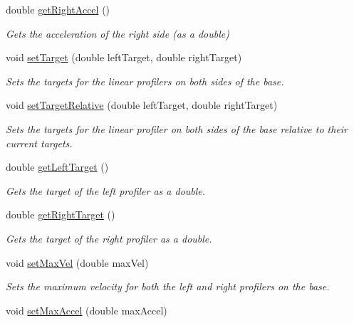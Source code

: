 \begin{DoxyCompactItemize}
double \mbox{\hyperlink{classfrc_1_1robot_1_1subsystems_1_1_base_a914de01840db6b8984e6594ff194ae00}{get\+Right\+Accel}} ()
\begin{DoxyCompactList}\small\item\em Gets the acceleration of the right side (as a double) \end{DoxyCompactList}\item 
void \mbox{\hyperlink{classfrc_1_1robot_1_1subsystems_1_1_base_a6d1643d8fb0b7cf4fff02f46c0edbd42}{set\+Target}} (double left\+Target, double right\+Target)
\begin{DoxyCompactList}\small\item\em Sets the targets for the linear profilers on both sides of the base. \end{DoxyCompactList}\item 
void \mbox{\hyperlink{classfrc_1_1robot_1_1subsystems_1_1_base_af59a0fae3d6c2c4150406fb02288d1a3}{set\+Target\+Relative}} (double left\+Target, double right\+Target)
\begin{DoxyCompactList}\small\item\em Sets the targets for the linear profiler on both sides of the base relative to their current targets. \end{DoxyCompactList}\item 
double \mbox{\hyperlink{classfrc_1_1robot_1_1subsystems_1_1_base_aa2dadd553dfc8910c56d24900a52f91e}{get\+Left\+Target}} ()
\begin{DoxyCompactList}\small\item\em Gets the target of the left profiler as a double. \end{DoxyCompactList}\item 
double \mbox{\hyperlink{classfrc_1_1robot_1_1subsystems_1_1_base_a4d560fe022c6baab267770a9e671ad7d}{get\+Right\+Target}} ()
\begin{DoxyCompactList}\small\item\em Gets the target of the right profiler as a double. \end{DoxyCompactList}\item 
void \mbox{\hyperlink{classfrc_1_1robot_1_1subsystems_1_1_base_ac9dd3bd7c9b68b3f2d2986e2f2dad632}{set\+Max\+Vel}} (double max\+Vel)
\begin{DoxyCompactList}\small\item\em Sets the maximum velocity for both the left and right profilers on the base. \end{DoxyCompactList}\item 
void \mbox{\hyperlink{classfrc_1_1robot_1_1subsystems_1_1_base_a66397121d0fe18c2132a48163d35af63}{set\+Max\+Accel}} (double max\+Accel)

\end{DoxyCompactItemize}

